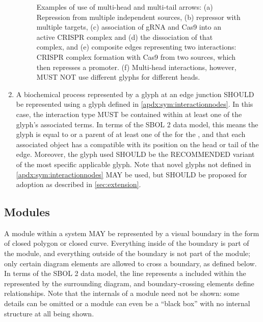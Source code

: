 \begin{enumerate}
\begin{figure}[h!]
	\caption{Examples of use of multi-head and multi-tail arrows: 
	(a) Repression from multiple independent sources, (b) repressor with multiple targets, 
	(c) association of gRNA and Cas9 into an active CRISPR complex and (d) the dissociation of that complex, and
	(e) composite edges representing two interactions: CRISPR complex formation with Cas9 from two sources, which then represses a promoter.
	(f) Multi-head interactions, however, MUST NOT use different glyphs for different heads.}
	\label{exa:4d}
	\end{figure}

\item A biochemical process represented by a glyph at an edge junction SHOULD be represented using a glyph defined in \ref{apdx:sym:interactionnodes}. In this case, the interaction type MUST be contained within at least one of the glyph's associated terms.
In terms of the SBOL 2 data model, this means the glyph is equal to or a parent of at least one of the  for the , and that each associated  object has a  compatible with its position on the head or tail of the edge.
	Moreover, the glyph used SHOULD be the RECOMMENDED variant of the most specific applicable glyph.  Note that novel glyphs not defined in \ref{apdx:sym:interactionnodes} MAY be used, but SHOULD be proposed for adoption as described in \ref{sec:extension}.
	
\end{enumerate}

\subsection{Modules}

A module within a system MAY be represented by a visual boundary in the form of closed polygon or closed curve.
Everything inside of the boundary is part of the module, and everything outside of the boundary is not part of the module; only certain diagram elements are allowed to cross a boundary, as defined below.
In terms of the SBOL 2 data model, the line represents a  included within the  represented by the surrounding diagram, and boundary-crossing elements define  relationships.
Note that the internals of a module need not be shown: some details can be omitted or a module can even be a ``black box'' with no internal structure at all being shown.


